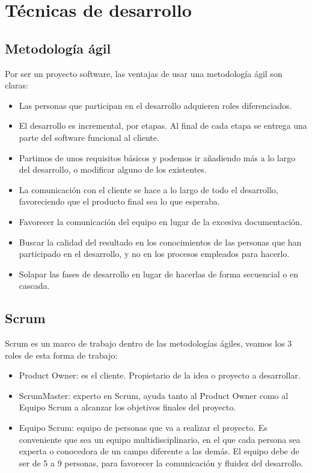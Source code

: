
\section{Técnicas de desarrollo}

\subsection{Metodología ágil}
Por ser un proyecto software, las ventajas de usar una metodología ágil son claras:

\begin{itemize}
	\item Las personas que participan en el desarrollo adquieren roles diferenciados.
	\item El desarrollo es incremental, por etapas. Al final de cada etapa se entrega una parte del software funcional al cliente.
	\item Partimos de unos requisitos básicos y podemos ir añadiendo más a lo largo del desarrollo, o modificar alguno de los existentes.
	\item La comunicación con el cliente se hace a lo largo de todo el desarrollo, favoreciendo que el producto final sea lo que esperaba.
	\item Favorecer la comunicación del equipo en lugar de la excesiva documentación.
	\item Buscar la calidad del resultado en los conocimientos de las personas que han participado en el desarrollo, y no en los procesos empleados para hacerlo.
	\item Solapar las fases de desarrollo en lugar de hacerlas de forma secuencial o en cascada.
\end{itemize}

\subsection{Scrum}
Scrum es un marco de trabajo dentro de las metodologías ágiles, veamos los 3 roles de esta forma de trabajo:

\begin{itemize}
	\item Product Owner: es el cliente. Propietario de la idea o proyecto a desarrollar. 
	\item ScrumMaster: experto en Scrum, ayuda tanto al Product Owner como al Equipo Scrum a alcanzar los objetivos finales del proyecto.
	\item Equipo Scrum: equipo de personas que va a realizar el proyecto. Es conveniente que sea un equipo multidisciplinario, en el que cada persona sea experta o conocedora de un campo diferente a las demás. El equipo debe de ser de 5 a 9 personas, para favorecer la comunicación y fluidez del desarrollo.
\end{itemize}

